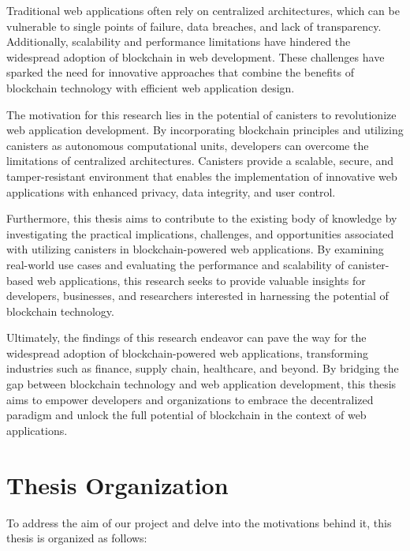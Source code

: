 Traditional web applications often rely on centralized architectures, which can be vulnerable to single points of failure, data breaches, and lack of transparency. Additionally, scalability and performance limitations have hindered the widespread adoption of blockchain in web development. These challenges have sparked the need for innovative approaches that combine the benefits of blockchain technology with efficient web application design.

The motivation for this research lies in the potential of canisters to revolutionize web application development. By incorporating blockchain principles and utilizing canisters as autonomous computational units, developers can overcome the limitations of centralized architectures. Canisters provide a scalable, secure, and tamper-resistant environment that enables the implementation of innovative web applications with enhanced privacy, data integrity, and user control.

Furthermore, this thesis aims to contribute to the existing body of knowledge by investigating the practical implications, challenges, and opportunities associated with utilizing canisters in blockchain-powered web applications. By examining real-world use cases and evaluating the performance and scalability of canister-based web applications, this research seeks to provide valuable insights for developers, businesses, and researchers interested in harnessing the potential of blockchain technology.

Ultimately, the findings of this research endeavor can pave the way for the widespread adoption of blockchain-powered web applications, transforming industries such as finance, supply chain, healthcare, and beyond. By bridging the gap between blockchain technology and web application development, this thesis aims to empower developers and organizations to embrace the decentralized paradigm and unlock the full potential of blockchain in the context of web applications.

\section{Thesis Organization}
To address the aim of our project and delve into the motivations behind it, this thesis is organized as follows:

